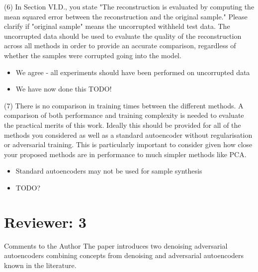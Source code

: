 \documentclass{article}
\begin{document}
{\color{blue}
(6) In Section VI.D., you state "The reconstruction is evaluated by computing the mean squared error between the reconstruction and the original sample." Please clarify if "original sample" means the uncorrupted withheld test data. The uncorrupted data should be used to evaluate the quality of the reconstruction across all methods in order to provide an accurate comparison, regardless of whether the samples were corrupted going into the model.}\newline

\begin{itemize}
    \item We agree - all experiments should have been performed on uncorrupted data
    \item We have now done this TODO!
\end{itemize}

{\color{blue}
(7) There is no comparison in training times between the different methods. A comparison of both performance and training complexity is needed to evaluate the practical merits of this work. Ideally this should be provided for all of the methods you considered as well as a standard autoencoder without regularisation or adversarial training. This is particularly important to consider given how close your proposed methods are in performance to much simpler methods like PCA.}\newline

\begin{itemize}
    \item Standard autoencoders may not be used for sample synthesis
    \item TODO?
\end{itemize}

\section{Reviewer: 3}

Comments to the Author
The paper introduces two denoising adversarial autoencoders combining concepts from denoising and adversarial autoencoders known in the literature. 
\end{document}
